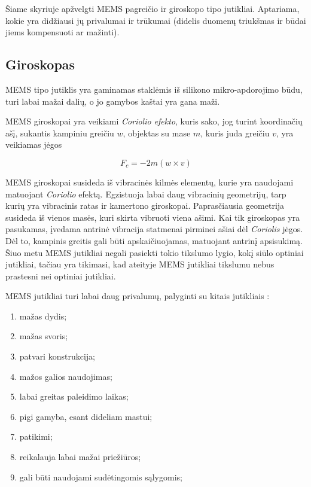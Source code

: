 Šiame skyriuje apžvelgti MEMS pagreičio ir giroskopo tipo jutikliai. 
Aptariama, kokie yra didžiausi jų privalumai ir trūkumai (didelis duomenų triukšmas ir būdai jiems kompensuoti ar mažinti).

\subsection{Giroskopas}

MEMS tipo jutiklis \cite{perlmutter2012high} yra gaminamas staklėmis iš silikono mikro-apdorojimo būdu, turi labai mažai dalių, o jo gamybos kaštai yra gana maži.

MEMS giroskopai yra veikiami \textit{Coriolio efekto}, kuris sako, jog turint koordinačių ašį, sukantis kampiniu greičiu $w$, objektas su mase $m$, kuris juda greičiu $v$, yra veikiamas jėgos

\begin{equation}
    F_c = -2m(w \times v)
\end{equation}

MEMS giroskopai susideda iš vibracinės kilmės elementų, kurie yra naudojami matuojant \textit{Coriolio} efektą. 
Egzistuoja labai daug vibracinių geometrijų, tarp kurių yra vibracinis ratas ir kamertono giroskopai. 
Paprasčiausia geometrija susideda iš vienos masės, kuri skirta vibruoti viena ašimi. 
Kai tik giroskopas yra pasukamas, įvedama antrinė vibracija statmenai pirminei ašiai dėl \textit{Coriolis} jėgos. 
Dėl to, kampinis greitis gali būti apskaičiuojamas, matuojant antrinį apsisukimą. 
Šiuo metu MEMS jutikliai negali pasiekti tokio tikslumo lygio, kokį siūlo optiniai jutikliai, tačiau yra tikimasi, kad ateityje MEMS jutikliai tikslumu nebus prastesni nei optiniai jutikliai.

MEMS jutikliai turi labai daug privalumų, palyginti su kitais jutikliais \cite{titterton2004strapdown}:

\begin{enumerate}
    \item mažas dydis;
    \item mažas svoris;
    \item patvari konstrukcija;
    \item mažos galios naudojimas;
    \item labai greitas paleidimo laikas;
    \item pigi gamyba, esant dideliam mastui;
    \item patikimi;
    \item reikalauja labai mažai priežiūros;
    \item gali būti naudojami sudėtingomis sąlygomis;
\end{enumerate}

